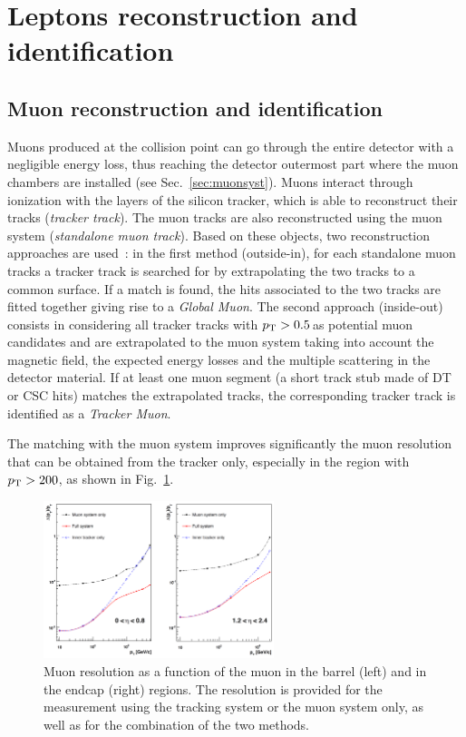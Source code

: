 \section{Leptons reconstruction and identification}\label{sec:leptonID}

\subsection{Muon reconstruction and identification}
Muons produced at the collision point can go through the entire detector with a negligible energy loss, thus reaching the detector outermost part where the muon chambers are installed (see Sec.~\ref{sec:muonsyst}). Muons interact through ionization with the layers of the silicon tracker, which is able to reconstruct their tracks (\emph{tracker track}). The muon tracks are also reconstructed using the muon system (\emph{standalone muon track}). Based on these objects, two reconstruction approaches are used~\cite{Chatrchyan:2012xi}: in the first method (outside-in), for each standalone muon tracks a tracker track is searched for by extrapolating the two tracks to a common surface. If a match is found, the hits associated to the two tracks are fitted together giving rise to a \emph{Global Muon}. The second approach (inside-out) consists in considering all tracker tracks with $p_\mathrm{T} > 0.5$\,\GeV as potential muon candidates and are extrapolated to the muon system taking into account the magnetic field, the expected energy losses and the multiple scattering in the detector material. If at least one muon segment (a short track stub made of DT or CSC hits) matches the extrapolated tracks, the corresponding tracker track is identified as a \emph{Tracker Muon}.

The matching with the muon system improves significantly the muon \pt resolution that can be obtained from the tracker only, especially in the region with $p_\mathrm{T} > 200$\GeV, as shown in Fig.~\ref{fig:muptres}. 
\begin{figure}[htb]
\centering
\includegraphics[width=0.6\textwidth]{images/muptres.png}
\caption{Muon \pt resolution as a function of the muon \pt in the barrel (left) and in the endcap (right) regions. The resolution is provided for the measurement using the tracking system or the muon system only, as well as for the combination of the two methods.}\label{fig:muptres}
\end{figure}

